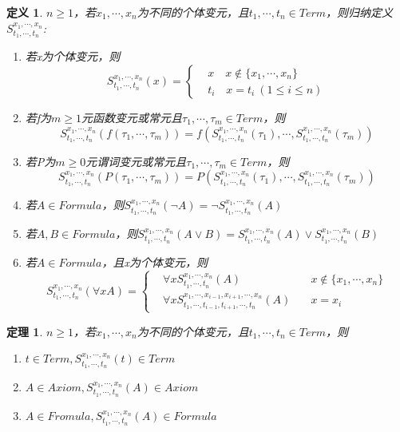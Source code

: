 \documentclass[a4paper]{ctexart}
\newtheorem{thm}{\hspace{2em}定理}[subsection]
\newtheorem{defi}{\hspace{2em}定义}[subsection]
\begin{document}
\begin{defi}
  $ n\geq 1$，若$x_1,\cdots,x_n$为不同的个体变元，且$t_1,\cdots,t_n\in Term$，则归纳定义$S^{x_1,\cdots,x_n}_{t_1,\cdots,t_n}$:
  \begin{enumerate}[itemindent=2em]
    \item 若x为个体变元，则
    $$S^{x_1,\cdots,x_n}_{t_1,\cdots,t_n}(x)=\left\{
    \begin{aligned}
      &x\quad x\not\in\{x_1,\cdots,x_n\} \\
      &t_i \quad x=t_i\ (1\leq i\leq n)
    \end{aligned}\right. $$
    \item 若f为$m\geq 1$元函数变元或常元且$\tau_1,\cdots,\tau_m\in Term$，则
    $$S^{x_1,\cdots,x_n}_{t_1,\cdots,t_n}(f(\tau_1,\cdots,\tau_m))=f(S^{x_1,\cdots,x_n}_{t_1,\cdots,t_n}(\tau_1),\cdots,S^{x_1,\cdots,x_n}_{t_1,\cdots,t_n}(\tau_m))$$
    \item 若P为$m\geq 0$元谓词变元或常元且$\tau_1,\cdots,\tau_m\in Term$，则  $$S^{x_1,\cdots,x_n}_{t_1,\cdots,t_n}(P(\tau_1,\cdots,\tau_m))=P(S^{x_1,\cdots,x_n}_{t_1,\cdots,t_n}(\tau_1),\cdots,S^{x_1,\cdots,x_n}_{t_1,\cdots,t_n}(\tau_m))$$
    \item 若$A\in Formula$，则$S^{x_1,\cdots,x_n}_{t_1,\cdots,t_n}(\neg A)=\neg S^{x_1,\cdots,x_n}_{t_1,\cdots,t_n}(A)$
    \item 若$A,B\in Formula$，则$S^{x_1,\cdots,x_n}_{t_1,\cdots,t_n}(A\vee B)=S^{x_1,\cdots,x_n}_{t_1,\cdots,t_n}(A)\vee S^{x_1,\cdots,x_n}_{t_1,\cdots,t_n}(B)$
    \item 若$A\in Formula$，且x为个体变元，则
    $$S^{x_1,\cdots,x_n}_{t_1,\cdots,t_n}(\forall{x}A)=\left\{
    \begin{aligned}
      &\forall{x}S^{x_1,\cdots,x_n}_{t_1,\cdots,t_n}(A) \quad &x\not\in\{x_1,\cdots,x_n\}\\
      &\forall{x}S^{x_1,\cdots,x_{i-1},x_{i+1},\cdots,x_n}_{t_1,\cdots,t_{i-1},t_{i+1},\cdots,t_n}(A) \quad& x=x_i
    \end{aligned}
    \right.$$
  \end{enumerate}
\end{defi}

\begin{thm}
  $ n\geq 1$，若$x_1,\cdots,x_n$为不同的个体变元，且$t_1,\cdots,t_n\in Term$，则
  \begin{enumerate}[itemindent=2em]
    \item $t\in Term,S^{x_1,\cdots,x_n}_{t_1,\cdots,t_n}(t)\in Term$
    \item $A\in Axiom,S^{x_1,\cdots,x_n}_{t_1,\cdots,t_n}(A)\in Axiom$
    \item $A\in Fromula,S^{x_1,\cdots,x_n}_{t_1,\cdots,t_n}(A)\in Formula$
  \end{enumerate}
\end{thm}
\end{document}

